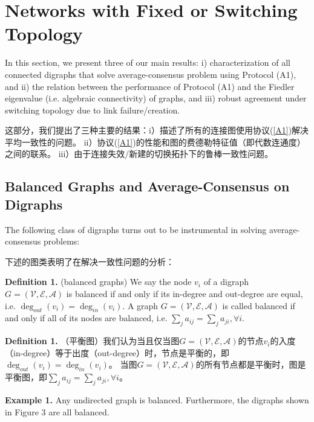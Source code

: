 \documentclass{article}
\begin{document}
\section{Networks with Fixed or Switching Topology}
{\color[gray]{0.5}
\noindent In this section, we present three of our main results: 
i) characterization of all connected digraphs that solve average-consensus problem using Protocol (A1), 
and ii) the relation between the performance of Protocol (A1) and the Fiedler eigenvalue (i.e. algebraic connectivity) of graphs, 
and iii) robust agreement under switching topology due to link failure/creation.
}

\noindent 这部分，我们提出了三种主要的结果：i）描述了所有的连接图使用协议(\ref{A1})解决平均一致性的问题。
ii）协议(\ref{A1})的性能和图的费德勒特征值（即代数连通度）之间的联系。
iii）由于连接失效/新建的切换拓扑下的鲁棒一致性问题。

\subsection{Balanced Graphs and Average-Consensus on Digraphs}
{\color[gray]{0.5}
\noindent The following class of digraphs turns out to be instrumental in solving average-consensus problems:
}

\noindent 下述的图类表明了在解决一致性问题的分析：

{\color[gray]{0.5}
\noindent \textbf{Definition 1.} (balanced graphs) We say the node $v_i$ of a digraph $G=(\mathcal{V}, \mathcal{E}, \mathcal{A})$ is balanced if and only if its in-degree and out-degree are equal, i.e. $\deg_{out}(v_i)=\deg_{in}(v_i)$. 
A graph $G=(\mathcal{V}, \mathcal{E}, \mathcal{A})$ is called balanced if and only if all of its nodes are balanced, i.e. $\sum_{j}a_{ij} = \sum_{j}a_{ji}, \forall i$.
}

\noindent \textbf{Definition 1.} （平衡图）我们认为当且仅当图$G=(\mathcal{V}, \mathcal{E}, \mathcal{A})$的节点$v_i$的入度（in-degree）等于出度（out-degree）时，节点是平衡的，即$\deg_{out}(v_i)=\deg_{in}(v_i)$。
当图$G=(\mathcal{V}, \mathcal{E}, \mathcal{A})$的所有节点都是平衡时，图是平衡图，即$\sum_{j}a_{ij} = \sum_{j}a_{ji}, \forall i$。

{\color[gray]{0.5}
\noindent \textbf{Example 1.} Any undirected graph is balanced. Furthermore, the digraphs shown in Figure 3 are all balanced.
}
\end{document}
